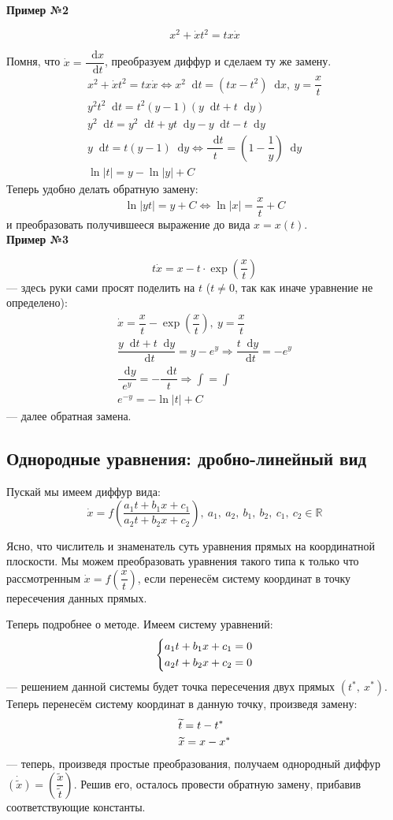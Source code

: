 \documentclass[a4paper,12pt]{article}
\newcommand{\R}{\mathbb{R}}
\renewcommand*\d{\mathop{}\!\mathrm{d}}
\newcommand{\dx}{\dot{x}}
\newcommand{\wx}{\widetilde{x}}
\newcommand{\wt}{\widetilde{t}}
\newcommand{\ds}{\displaystyle}
\begin{document}
\textbf{Пример №2}

\[x^2 + \dx t^2 = tx\dx\]

Помня, что $\dx = \dfrac{\d x}{\d t}$, преобразуем диффур и сделаем ту же замену.
\begin{gather*}
	x^2 + \dx t^2 = tx\dx \iff x^2 \d t = (tx - t^2)\d x,\ y = \dfrac{x}{t}\\
	y^2t^2\d t = t^2(y - 1)(y\d t + t\d y)\\
	y^2\d t = y^2\d t + yt\d y - y\d t - t\d y\\
	y\d t = t(y - 1)\d y \iff 
	\dfrac{\d t}{t} = \left(1 - \dfrac{1}{y}\right)\d y\\
	\ln |t| = y - \ln |y| + C
\end{gather*}
Теперь удобно делать обратную замену:
\[\ln |yt| = y + C \iff \ln |x| = \dfrac{x}{t} + C\] и преобразовать получившееся выражение до вида $x = x(t)$.
\ \\

\textbf{Пример №3}

\[t\dx = x - t \cdot \exp(\dfrac{x}{t})\] --- здесь руки сами просят поделить на $t$ ($t \neq 0$, так как иначе уравнение не определено):
\begin{gather*}
	\dx = \dfrac{x}{t} - \exp(\dfrac{x}{t}),\ y = \dfrac{x}{t}\\
	\dfrac{y\d t + t\d y}{\d t} = y - e^y \Longrightarrow \dfrac{t\d y}{\d t} = - e^y\\
	\dfrac{\d y}{e^y} = -\dfrac{\d t}{t} \Longrightarrow \ds\int = \int\\
	e^{-y} = -\ln |t| + C
\end{gather*} --- далее обратная замена.

\subsection{Однородные уравнения: дробно-линейный вид}

Пускай мы имеем диффур вида:
\[\dx = f\left(\dfrac{a_1t + b_1x + c_1}{a_2t + b_2x + c_2}\right),\ a_1,\ a_2,\ b_1,\ b_2,\ c_1,\ c_2 \in \R\]

Ясно, что числитель и знаменатель суть уравнения прямых на координатной плоскости. Мы можем преобразовать уравнения такого типа к только что рассмотренным $\dx = f\left(\dfrac{x}{t}\right)$, если перенесём систему координат в точку пересечения данных прямых. 

Теперь подробнее о методе. Имеем систему уравнений:
\[\left\{\begin{gathered}
	a_1t + b_1x + c_1 = 0\hfill\\
	a_2t + b_2x + c_2 = 0\hfill
\end{gathered}\right.\] --- решением данной системы будет точка пересечения двух прямых $(t^*,\ x^*)$. Теперь перенесём систему координат в данную точку, произведя замену:
\[\begin{gathered}
	\wt = t - t^*\hfill\\
	\wx = x - x^*\hfill
\end{gathered}\] --- теперь, произведя простые преобразования, получаем однородный диффур $\dot{(\wx)} = \left(\dfrac{\wx}{\wt}\right)$. 	Решив его, осталось провести обратную замену, прибавив соответствующие константы.
\end{document}
